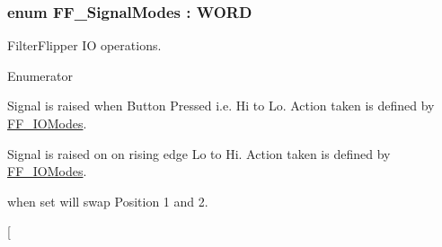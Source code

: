 \subsubsection[{\texorpdfstring{F\+F\+\_\+\+Signal\+Modes}{FF_SignalModes}}]{\setlength{\rightskip}{0pt plus 5cm}enum {\bf F\+F\+\_\+\+Signal\+Modes} \+: W\+O\+RD}\hypertarget{group___filter_flipper_ga0049497885ad3480ad2ccbb1d354809a}{}\label{group___filter_flipper_ga0049497885ad3480ad2ccbb1d354809a}


Filter\+Flipper IO operations. 

\begin{Desc}
\item[Enumerator]\par
\begin{description}
\item[{\em 
F\+F\+\_\+\+Input\+Button\hypertarget{group___filter_flipper_gga0049497885ad3480ad2ccbb1d354809aa791b8a165109c49d41d5ad06142fca38}{}\label{group___filter_flipper_gga0049497885ad3480ad2ccbb1d354809aa791b8a165109c49d41d5ad06142fca38}
}]Signal is raised when Button Pressed i.\+e. Hi to Lo. Action taken is defined by \hyperlink{group___filter_flipper_ga3f9223ae197e5703d709034a238d3925}{F\+F\+\_\+\+I\+O\+Modes}. \item[{\em 
F\+F\+\_\+\+Input\+Logic\hypertarget{group___filter_flipper_gga0049497885ad3480ad2ccbb1d354809aa8658558cb04d68f7b6a13ca3316022ca}{}\label{group___filter_flipper_gga0049497885ad3480ad2ccbb1d354809aa8658558cb04d68f7b6a13ca3316022ca}
}]Signal is raised on on rising edge Lo to Hi. Action taken is defined by \hyperlink{group___filter_flipper_ga3f9223ae197e5703d709034a238d3925}{F\+F\+\_\+\+I\+O\+Modes}. \item[{\em 
F\+F\+\_\+\+Input\+Swap\hypertarget{group___filter_flipper_gga0049497885ad3480ad2ccbb1d354809aab1e5887ceee0bbc01e2ebe28816c90f8}{}\label{group___filter_flipper_gga0049497885ad3480ad2ccbb1d354809aab1e5887ceee0bbc01e2ebe28816c90f8}
}]when set will swap Position 1 and 2. \item[{\em 
}
\end{description}
\end{Desc}
